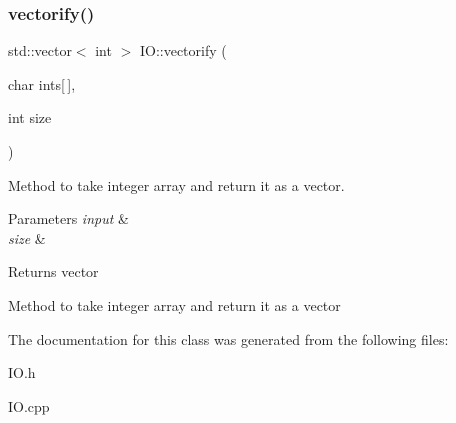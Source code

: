 \subsubsection{\texorpdfstring{vectorify()}{vectorify()}}
{\footnotesize\ttfamily std\+::vector$<$ int $>$ I\+O\+::vectorify (\begin{DoxyParamCaption}\item[{char}]{ints\mbox{[}$\,$\mbox{]},  }\item[{int}]{size }\end{DoxyParamCaption})}



Method to take integer array and return it as a vector. 


\begin{DoxyParams}{Parameters}
{\em input} & \\
\hline
{\em size} & \\
\hline
\end{DoxyParams}
\begin{DoxyReturn}{Returns}
vector
\end{DoxyReturn}
Method to take integer array and return it as a vector 

The documentation for this class was generated from the following files\+:\begin{DoxyCompactItemize}
\item 
I\+O.\+h\item 
I\+O.\+cpp\end{DoxyCompactItemize}
